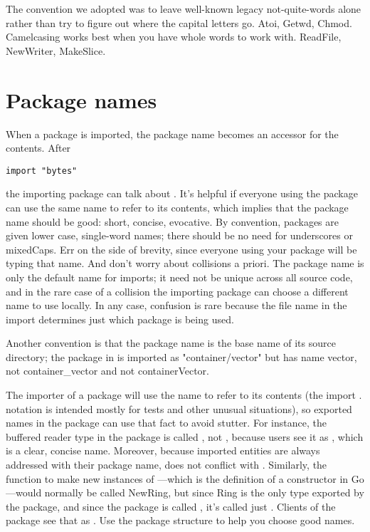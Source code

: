 The convention we adopted was to leave well-known legacy
not-quite-words alone rather than try to figure out where
the capital letters go.  Atoi, Getwd, Chmod.
Camelcasing works best when you have whole words
to work with.  ReadFile, NewWriter, MakeSlice.

\section{Package names}
When a package is imported, the package name becomes an accessor for the
contents. After
\begin{lstlisting}
import "bytes"
\end{lstlisting}
the importing package can talk about . It's helpful if
everyone using the package can use the same name to refer to its
contents, which implies that the package name should be good: short,
concise, evocative. By convention, packages are given lower case,
single-word names; there should be no need for underscores or mixedCaps.
Err on the side of brevity, since everyone using your package will be
typing that name. And don't worry about collisions a priori. The package
name is only the default name for imports; it need not be unique across
all source code, and in the rare case of a collision the importing
package can choose a different name to use locally. In any case,
confusion is rare because the file name in the import determines just
which package is being used.

Another convention is that the package name is the base name of its
source directory; the package in  is imported as
"container/vector" but has name vector, not container\_vector and not
containerVector.

The importer of a package will use the name to refer to its contents
(the import . notation is intended mostly for tests and other unusual
situations), so exported names in the package can use that fact to avoid
stutter. For instance, the buffered reader type in the  package is
called , not , because users see it as
,
which is a clear, concise name. Moreover, because imported entities are
always addressed with their package name,  does not conflict
with . Similarly, the function to make new instances of
—which is the definition of a constructor in Go—would normally
be called NewRing, but since Ring is the only type exported by the
package, and since the package is called , it's called
just .
Clients of the package see that as . Use the package structure
to help you choose good names.

